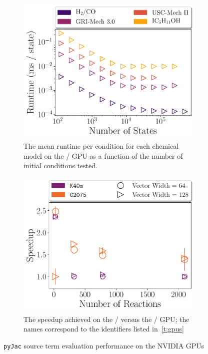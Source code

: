 \documentclass[12pt,number,sort&compress,preprint]{elsarticle}
\begin{document}
\begin{figure}[htbp]
   \centering
  \begin{subfigure}[t]{0.48\linewidth}
      \includegraphics[width=\textwidth]{gpu_source_scaling.pdf}
      \caption{The mean runtime per condition for each chemical model on the \gpunew/ GPU as a function of the number of initial conditions tested.}
      \label{F:gpu_source_scaling}
  \end{subfigure}
  \hfill
  \begin{subfigure}[t]{0.48\linewidth}
      \includegraphics[width=\textwidth]{gpu_source_speedup.pdf}
      \caption{The speedup achieved on the \gpunew/ versus the \gpuold/ GPU; the names correspond to the identifiers listed in~\cref{t:gpus}}
      \label{F:gpu_source_speedup}
  \end{subfigure}
  \caption{\texttt{pyJac} source term evaluation performance on the NVIDIA GPUs}
  \label{F:gpu_source}
\end{figure}
\end{document}
